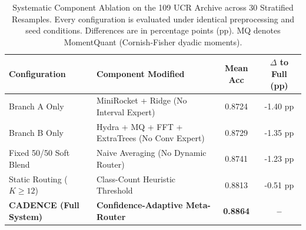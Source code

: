 \begin{table}[t]
\centering
\caption{Systematic Component Ablation on the 109 UCR Archive across 30 Stratified Resamples. Every configuration is evaluated under identical preprocessing and seed conditions. Differences are in percentage points (pp). MQ denotes MomentQuant (Cornish-Fisher dyadic moments).}
\label{tab:ablation}
\small
\begin{tabular}{llcc}
\toprule
\textbf{Configuration} & \textbf{Component Modified} & \textbf{Mean Acc} & \textbf{$\Delta$ to Full (pp)} \\
\midrule
Branch A Only & MiniRocket + Ridge (No Interval Expert) & 0.8724 & -1.40 pp \\
Branch B Only & Hydra + MQ + FFT + ExtraTrees (No Conv Expert) & 0.8729 & -1.35 pp \\
Fixed 50/50 Soft Blend & Naive Averaging (No Dynamic Router) & 0.8741 & -1.23 pp \\
Static Routing ($K \ge 12$) & Class-Count Heuristic Threshold & 0.8813 & -0.51 pp \\
\textbf{CADENCE (Full System)} & \textbf{Confidence-Adaptive Meta-Router} & \textbf{0.8864} & \textbf{--} \\
\bottomrule
\end{tabular}
\end{table}
